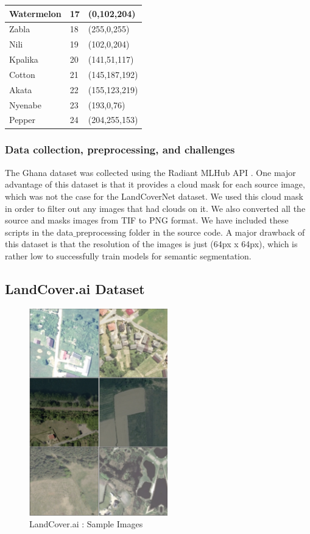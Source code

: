 \documentclass[conference]{IEEEtran}
\begin{document}
\begin{table}[htbp]
\begin{tabular}{|p{2.2cm}|p{0.7cm}|p{1.6cm}|}
 \hline
  Watermelon & 17  & (0,102,204)\\ 
 \hline
  Zabla & 18 & (255,0,255)\\ 
 \hline
  Nili & 19 & (102,0,204)\\ 
 \hline
  Kpalika & 20 & (141,51,117)\\ 
 \hline
  Cotton & 21 & (145,187,192)\\ 
 \hline
  Akata & 22 & (155,123,219)\\ 
 \hline
  Nyenabe & 23 & (193,0,76)\\ 
 \hline
  Pepper & 24 & (204,255,153)\\ 
 \hline
\end{tabular}
\label{ghana_dataset_class_table}
\end{table}


\subsubsection{Data collection, preprocessing, and challenges}
The Ghana dataset was collected using the Radiant MLHub API \cite{radiant_mlhub_api}.
One major advantage of this dataset is that it provides a cloud mask for each source image, which was not the case for the LandCoverNet dataset. We used this cloud mask in order to filter out any images that had clouds on it. We also converted all the source and masks images from TIF to PNG format. We have included these scripts in the data$\_$preprocessing folder in the source code. A major drawback of this dataset is that the resolution of the images is just (64px x 64px), which is rather low to successfully train models for semantic segmentation.


\subsection{LandCover.ai Dataset}

\begin{figure}[h]
    \centering
    \includegraphics[width=6cm, height=9cm]{images/dataset-vis.png}
    \caption{LandCover.ai : Sample Images}
\end{figure}
\end{document}

